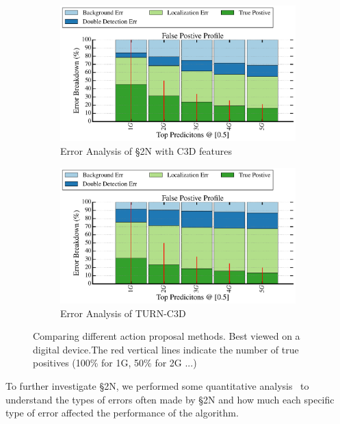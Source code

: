 \documentclass[10pt,journal,compsoc]{IEEEtran}
\begin{document}
\begin{figure}
\centering
\begin{subfigure}[b]{0.95\linewidth}
\includegraphics[width=\textwidth]{figures/ErrorDiag/false_positive_analysis-THUMOS14-EMD-HUG-0011-kG-tiou-05.pdf}
\vskip -0.05in
\caption{Error Analysis of \S2N with C3D features}
\end{subfigure}
\vskip 0.15in 
\begin{subfigure}[b]{0.95\linewidth}
\includegraphics[width=\textwidth]{figures/ErrorDiag/false_positive_analysis-TurnC3D-kG-tiou-05.pdf}
\vskip -0.05in
\caption{Error Analysis of TURN-C3D}

\end{subfigure}
\caption{\label{fig:error-diag}Comparing different action proposal methods. Best viewed on a digital device.The red vertical lines indicate the number of true positives (100\% for 1G, 50\% for 2G ...)}
\end{figure}

To further investigate \S2N, we  performed some quantitative analysis~\cite{alwassel_2018_detad} to understand the types of errors often made by \S2N and how much each specific type of error affected the performance of the algorithm. 
\end{document}

